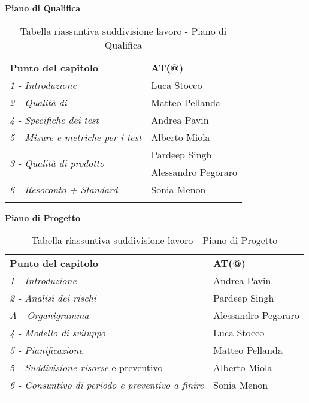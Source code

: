 		\begin{center}
			\textbf{Piano di Qualifica}\\[0.25cm]
			\renewcommand{\arraystretch}{1.5}
			\begin{longtable}{  p{6cm} p{4cm}  }
				\rowcolor{tableHeadYellow}
				\textbf{Punto del capitolo}&\textbf{AT(@)}\\
					\emph{1 - Introduzione} & Luca Stocco  \\ \emph{2 - Qualità di \markg{processo}} & Matteo Pellanda\\
				\hline
				\emph{4 - Specifiche dei test} & Andrea Pavin  \\ \emph{5 - Misure e metriche per i test} & Alberto Miola\\
				\hline
				\multirow{2}{*}{\emph{3 - Qualità di prodotto}} & Pardeep Singh\\&Alessandro Pegoraro\\
				\hline
				\emph{6 - Resoconto + Standard \markg{ISO}} & Sonia Menon\\
				\hline
				\rowcolor{white}
				\caption{Tabella riassuntiva suddivisione lavoro - Piano di Qualifica}
					\label{sec:tabella_riassuntiva2}
			\end{longtable}	
		\end{center}
		\clearpage
		\begin{center}
		\textbf{Piano di Progetto}\\[0.25cm]
		\renewcommand{\arraystretch}{1.5}
		\begin{longtable}{  p{8cm} p{4cm}  }
			\rowcolor{tableHeadYellow}
			\textbf{Punto del capitolo}&\textbf{AT(@)}\\
			\emph{1 - Introduzione} & Andrea Pavin  \\ \emph{2 - Analisi dei rischi} & Pardeep Singh\\ \emph{A - Organigramma} & Alessandro Pegoraro\\
			\hline
			\emph{4 - Modello di sviluppo} & Luca Stocco  \\ \emph{5 - Pianificazione} & Matteo Pellanda\\
			\hline
			\emph{5 - Suddivisione risorse} e preventivo & Alberto Miola\\ \emph{6 - Consuntivo di periodo e preventivo a finire} & Sonia Menon\\
			\hline
			\rowcolor{white}
			\caption{Tabella riassuntiva suddivisione lavoro - Piano di Progetto}
				\label{sec:tabella_riassuntiva3}
		\end{longtable}	
		\end{center}
	
